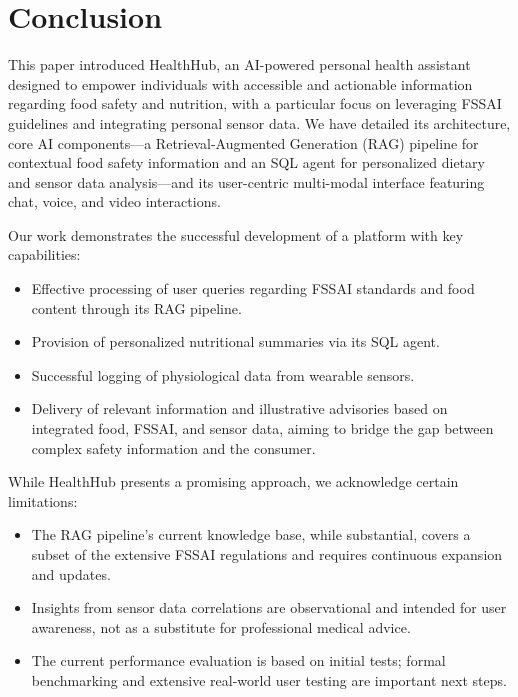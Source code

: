 \section{Conclusion}

This paper introduced HealthHub, an AI-powered personal health assistant designed to empower individuals with accessible and actionable information regarding food safety and nutrition, with a particular focus on leveraging FSSAI guidelines and integrating personal sensor data. We have detailed its architecture, core AI components—a Retrieval-Augmented Generation (RAG) pipeline for contextual food safety information and an SQL agent for personalized dietary and sensor data analysis—and its user-centric multi-modal interface featuring chat, voice, and video interactions.

Our work demonstrates the successful development of a platform with key capabilities:
\begin{itemize}
    \item Effective processing of user queries regarding FSSAI standards and food content through its RAG pipeline.
    \item Provision of personalized nutritional summaries via its SQL agent.
    \item Successful logging of physiological data from wearable sensors.
    \item Delivery of relevant information and illustrative advisories based on integrated food, FSSAI, and sensor data, aiming to bridge the gap between complex safety information and the consumer.
\end{itemize}

While HealthHub presents a promising approach, we acknowledge certain limitations:
\begin{itemize}
    \item The RAG pipeline's current knowledge base, while substantial, covers a subset of the extensive FSSAI regulations and requires continuous expansion and updates.
    \item Insights from sensor data correlations are observational and intended for user awareness, not as a substitute for professional medical advice.
    \item The current performance evaluation is based on initial tests; formal benchmarking and extensive real-world user testing are important next steps.
\end{itemize}

